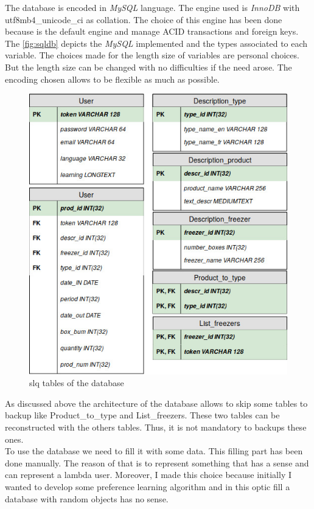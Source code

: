 The database is encoded in \textit{MySQL} language. The engine used is \textit{InnoDB} with utf8mb4\_unicode\_ci as collation. The choice of this engine has been done because is the default engine and manage ACID transactions and foreign keys. The \autoref{fig:sqldb} depicts the \textit{MySQL} implemented and the types associated to each variable. The choices made for the length size of variables are personal choices. But the length size can be changed with no difficulties if the need arose. The encoding chosen allows to be flexible as much as possible.

\begin{figure}[H]
\centering
\includegraphics[scale=0.5]{./images/sqldb.jpg}
\caption{slq tables of the database}
\label{fig:sqldb}
\end{figure}

As discussed above the architecture of the database allows to skip some tables to backup like Product\_to\_type and List\_freezers. These two tables can be reconstructed with the others tables. Thus, it is not mandatory to backups these ones.\\

To use the database we need to fill it with some data. This filling part has been done manually. The reason of that is to represent something that has a sense and can represent a lambda user. Moreover, I made this choice because initially I wanted to develop some preference learning algorithm and in this optic fill a database with random objects has no sense. 

